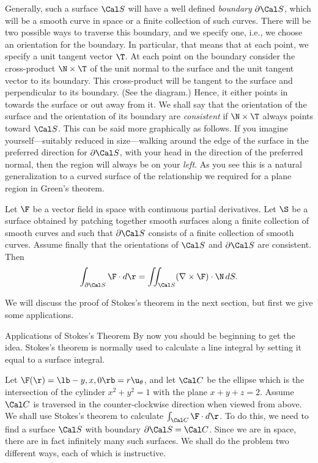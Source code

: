 Generally,
 such a surface  $\Cal S$ will have a well 
defined {\it boundary} $\partial \Cal S$,
which will be  a smooth curve in space or a finite collection of such
curves.  There will be two possible ways to traverse this boundary,
and we specify one, i.e., we choose an orientation for the
boundary.  In particular, that means that at each point, we specify
a unit tangent vector $\T$.
%
At each point on the boundary consider the
 cross-product $\N\times\T$ of the unit normal to the surface
and the unit tangent vector to its boundary.  This
cross-product will be tangent
to the surface and
 perpendicular to its boundary.  (See the diagram.)  Hence,
it either points in towards the surface or out away from it.  We
shall say that the orientation of the surface and the orientation
of its boundary are {\it consistent\/} if $\N\times\T$ always points
toward $\Cal S$.  This can be said more graphically as follows.
If you imagine yourself---suitably reduced in size---walking
around the edge of the surface in the preferred direction for
$\partial \Cal S$,  with your head in the direction of
the preferred normal, then the region will always be on your {\it
left}.  As you see this is a natural generalization to a
curved surface of the relationship we required for a plane
region in Green's theorem.
\medskip
\centerline{}
\medskip
\nextthm
{}
Let $\F$ be a vector field in space with continuous partial
derivatives.  Let $\S$ be a surface obtained by patching
together smooth surfaces along a finite collection of smooth
curves and such that $\partial \Cal S$  consists of
a finite collection of smooth curves.  Assume finally that
the orientations of $\Cal S$ and $\partial \Cal S$ are
consistent. Then
$$
\int_{\partial \Cal S} \F\cdot d\r =
\iint_{\Cal S} (\nabla\times\F)\cdot\N\,dS.
$$
\endproclaim
{}%

We will discuss the proof of Stokes's theorem in the next
section, but first we give some applications.

\subhead Applications of Stokes's Theorem \endsubhead
By now you should be beginning to get the idea.  Stokes's
theorem is normally used to calculate a line integral by
setting it equal to a surface integral.

\nextex
{}  Let  $\F(\r) = \lb -y, x, 0 \rb
= r\u_\theta$, and let
$\Cal C$ be the ellipse which is the intersection of the
cylinder $x^2 + y^2 = 1$ with the plane $x + y + z = 2$.
Assume $\Cal C$ is traversed in the counter-clockwise direction
when viewed from above.  We shall use Stokes's theorem to
calculate $\int_{\Cal C}\F\cdot d\r$.  To do this, we need
to find a surface $\Cal S$ with boundary $\partial \Cal S
= \Cal C$.  Since we are in space, there are in fact infinitely
many such surfaces.  We shall do the problem two different ways,
each of which is instructive.

